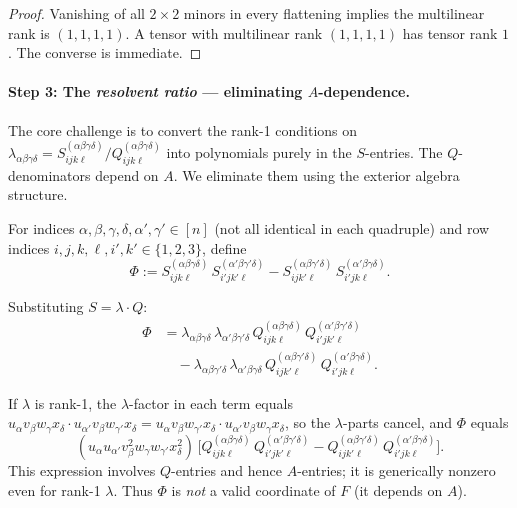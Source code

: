 \begin{proof}
Vanishing of all $2\times 2$ minors in every flattening implies the multilinear rank
is $(1,1,1,1)$. A tensor with multilinear rank $(1,1,1,1)$ has tensor rank $1$.
The converse is immediate.
\end{proof}

\paragraph{Step 3: The \emph{resolvent ratio} --- eliminating $A$-dependence.}

The core challenge is to convert the rank-1 conditions on
$\lambda_{\alpha\beta\gamma\delta} = S^{(\alpha\beta\gamma\delta)}_{ijk\ell}/Q^{(\alpha\beta\gamma\delta)}_{ijk\ell}$
into polynomials purely in the $S$-entries. The $Q$-denominators depend on $A$.
We eliminate them using the exterior algebra structure.

\begin{definition}\label{def:p9-resolvent}
For indices $\alpha,\beta,\gamma,\delta,\alpha',\gamma'\in[n]$ (not all identical in
each quadruple) and row indices $i,j,k,\ell,i',k'\in\{1,2,3\}$, define
\begin{equation}\label{eq:p9-resolvent}
  \Phi := S^{(\alpha\beta\gamma\delta)}_{ijk\ell}\,
  S^{(\alpha'\beta\gamma'\delta)}_{i'jk'\ell}
  - S^{(\alpha\beta\gamma'\delta)}_{ijk'\ell}\,
  S^{(\alpha'\beta\gamma\delta)}_{i'jk\ell}.
\end{equation}
\end{definition}

Substituting $S = \lambda\cdot Q$:
\begin{align*}
  \Phi &= \lambda_{\alpha\beta\gamma\delta}\,\lambda_{\alpha'\beta\gamma'\delta}\,
  Q^{(\alpha\beta\gamma\delta)}_{ijk\ell}\,Q^{(\alpha'\beta\gamma'\delta)}_{i'jk'\ell}\\
  &\quad - \lambda_{\alpha\beta\gamma'\delta}\,\lambda_{\alpha'\beta\gamma\delta}\,
  Q^{(\alpha\beta\gamma'\delta)}_{ijk'\ell}\,Q^{(\alpha'\beta\gamma\delta)}_{i'jk\ell}.
\end{align*}

If $\lambda$ is rank-1, the $\lambda$-factor in each term equals
$u_\alpha v_\beta w_\gamma x_\delta\cdot u_{\alpha'}v_\beta w_{\gamma'}x_\delta
= u_\alpha v_\beta w_{\gamma'} x_\delta\cdot u_{\alpha'}v_\beta w_\gamma x_\delta$,
so the $\lambda$-parts cancel, and $\Phi$ equals
\[
  (u_\alpha u_{\alpha'}v_\beta^2 w_\gamma w_{\gamma'} x_\delta^2)\,
  \bigl[Q^{(\alpha\beta\gamma\delta)}_{ijk\ell}\,Q^{(\alpha'\beta\gamma'\delta)}_{i'jk'\ell}
  - Q^{(\alpha\beta\gamma'\delta)}_{ijk'\ell}\,Q^{(\alpha'\beta\gamma\delta)}_{i'jk\ell}\bigr].
\]
This expression involves $Q$-entries and hence $A$-entries; it is generically nonzero even for rank-1 $\lambda$.
Thus $\Phi$ is \emph{not} a valid coordinate of $F$ (it depends on $A$).

